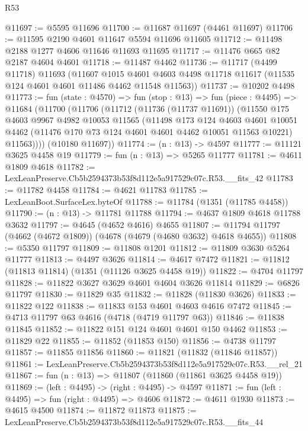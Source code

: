 \begin{lexlean}{R53}
\begin{coremodule}
@11697 := @5595 @11696
@11700 := @11687 @11697 (@4461 @11697)
@11706 := @11595 @2190 @4601 @11647 @5594 @11696 @11605
@11712 := @11498 @2188 @1277 @4606 @11646 @11693 @11695
@11717 := @11476 @665 @82 @2187 @4604 @4601
@11718 := @11487 @4462
@11736 := @11717
    (@4499 @11718)
    @11693
    (@11607
      @1015
      @4601
      @4603
      @4498
      @11718
      @11617
      (@11535 @124 @4601 @4601 @11486 @4462 @11548 @11563))
@11737 := @10202 @4498
@11773 := fun (state : @4570) =>
  fun (stop : @13) =>
  fun (piece : @4495) =>
  @11684
    (@11700
      (@11706
        (@11712
          (@11736 (@11737 @11691))
          (@11550
            @175
            @4603
            @9967
            @4982
            @10053
            @11565
            (@11498
              @173
              @124
              @4603
              @4601
              @10051
              @4462
              (@11476 @170 @73 @124 @4601 @4601 @4462 @10051 @11563 @10221)
              @11563))))
      (@10180 @11697))
@11774 := (n : @13) -> @4597
@11777 := @11121 @3625 @4458 @19
@11779 := fun (n : @13) => @5265 @11777
@11781 := @4611 @1809 @4618
@11782 := LexLeanPreserve.Cb5b2594373b53f8d112e5a917529c07c.R53.__fits_42
@11783 := @11782 @4458
@11784 := @4621 @11783
@11785 := LexLeanBoot.SurfaceLex.byteOf
@11788 := @11784 (@1351 (@11785 @4458))
@11790 := (n : @13) -> @11781 @11788
@11794 := @4637 @1809 @4618 @11788 @3632
@11797 := @4645 (@4652 @4616) @4655
@11807 := @11794 @11797 (@4662 (@4672 @1809)) (@4678 (@4679 (@4680 @3632) @4618 @4655))
@11808 := @5350 @11797
@11809 := @11808 @1201
@11812 := @11809 @3630 @5264 @11777
@11813 := @4497 @3626
@11814 := @4617 @7472
@11821 := @11812 (@11813 @11814) (@1351 (@11126 @3625 @4458 @19))
@11822 := @4704 @11797
@11828 := @11822 @3627 @3629 @4601 @4604 @3626 @11814
@11829 := @6826 @11797
@11830 := @11829 @35
@11832 := @11828 (@11830 @3626)
@11833 := @11822 @122
@11838 := @11833 @153 @4601 @4603 @4616 @7472
@11845 := @4713 @11797 @63 @4616 (@4718 (@4719 @11797 @63))
@11846 := @11838 @11845
@11852 := @11822 @151 @124 @4601 @4601 @150 @4462
@11853 := @11829 @22
@11855 := @11852 (@11853 @150)
@11856 := @4738 @11797
@11857 := @11855 @11856
@11860 := @11821 (@11832 (@11846 @11857))
@11861 := LexLeanPreserve.Cb5b2594373b53f8d112e5a917529c07c.R53.__rel_21
@11867 := fun (n : @13) => @11807 (@11860 (@11861 @3625 @4458 @19))
@11869 := (left : @4495) -> (right : @4495) -> @4597
@11871 := fun (left : @4495) => fun (right : @4495) => @4606
@11872 := @4611 @1930
@11873 := @4615 @4500
@11874 := @11872 @11873
@11875 := LexLeanPreserve.Cb5b2594373b53f8d112e5a917529c07c.R53.__fits_44

\end{coremodule}
\end{lexlean}
